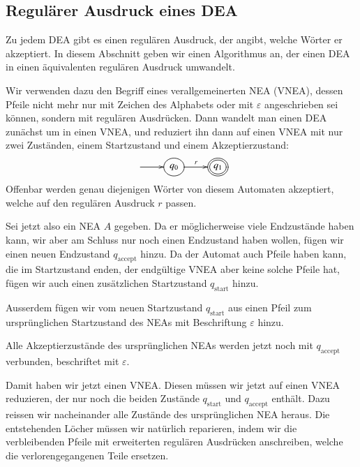 \subsection{Regulärer Ausdruck eines DEA\label{regulaer:dea-re}}
Zu jedem DEA gibt es einen regulären Ausdruck, der angibt,
welche Wörter er akzeptiert.
In diesem Abschnitt geben
wir einen Algorithmus an, der einen DEA in einen äquivalenten
regulären Ausdruck umwandelt.

Wir verwenden dazu den Begriff eines verallgemeinerten NEA (VNEA),
dessen Pfeile nicht mehr nur mit Zeichen des Alphabets oder mit
$\varepsilon$ angeschrieben sei können, sondern mit regulären
Ausdrücken.
Dann wandelt man einen DEA zunächst um in einen
VNEA, und reduziert ihn dann auf einen VNEA mit nur zwei Zuständen,
einem Startzustand und einem Akzeptierzustand:
\[
\entrymodifiers={++[o][F]}
\xymatrix{
*+\txt{}\ar[r]
	&{q_0}\ar[r]^{r}
		&*++[o][F=]{q_1}
}
\]
Offenbar werden genau diejenigen Wörter von diesem Automaten
akzeptiert, welche auf den regulären Ausdruck $r$ passen.

Sei jetzt also ein NEA $A$ gegeben.
Da er möglicherweise viele
Endzustände haben kann, wir aber am Schluss nur noch einen
Endzustand haben wollen, fügen wir einen neuen Endzustand
$q_{\text{accept}}$ hinzu.
Da der Automat auch Pfeile haben kann, die im Startzustand enden,
der endgültige VNEA aber keine solche Pfeile hat, fügen wir
auch einen zusätzlichen Startzustand $q_{\text{start}}$ hinzu.


Ausserdem fügen wir vom neuen Startzustand $q_{\text{start}}$
aus einen Pfeil zum ursprünglichen Startzustand des NEAs mit Beschriftung $\varepsilon$ hinzu.

Alle Akzeptierzustände des ursprünglichen NEAs werden jetzt noch mit
$q_{\text{accept}}$ verbunden, beschriftet mit $\varepsilon$.

Damit haben wir jetzt einen VNEA.
Diesen müssen wir jetzt auf einen VNEA reduzieren, der nur noch
die beiden Zustände $q_{\text{start}}$ und $q_{\text{accept}}$
enthält.
Dazu reissen wir nacheinander alle Zustände des ursprünglichen
NEA heraus.
Die entstehenden Löcher müssen wir natürlich reparieren, indem wir die
verbleibenden Pfeile mit erweiterten regulären Ausdrücken
anschreiben, welche die verlorengegangenen Teile ersetzen.

